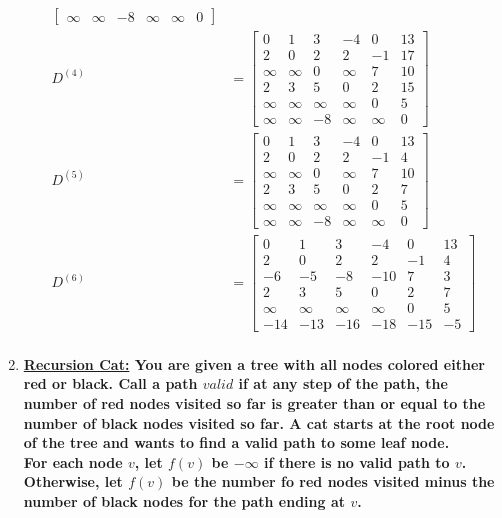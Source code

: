 \documentclass{article}
\begin{document}
\begin{enumerate}
\begin{align*}
\begin{bmatrix}
        \infty & \infty & -8 & \infty & \infty & 0
    \end{bmatrix} \\
    D^{(4)} & = 
    \begin{bmatrix}
        0 & 1 & 3 & -4 & 0 & 13 \\
        2 & 0 & 2 & 2 & -1 & 17 \\
        \infty & \infty & 0 & \infty & 7 & 10 \\
        2 & 3 & 5 & 0 & 2 & 15 \\
        \infty & \infty & \infty & \infty & 0 & 5 \\
        \infty & \infty & -8 & \infty & \infty & 0
    \end{bmatrix} \\
    D^{(5)} & = 
    \begin{bmatrix}
        0 & 1 & 3 & -4 & 0 & 13 \\
        2 & 0 & 2 & 2 & -1 & 4 \\
        \infty & \infty & 0 & \infty & 7 & 10 \\
        2 & 3 & 5 & 0 & 2 & 7 \\
        \infty & \infty & \infty & \infty & 0 & 5 \\
        \infty & \infty & -8 & \infty & \infty & 0
    \end{bmatrix} \\
    D^{(6)} & = 
    \begin{bmatrix}
        0 & 1 & 3 & -4 & 0 & 13 \\
        2 & 0 & 2 & 2 & -1 & 4 \\
        -6 & -5 & -8 & -10 & 7 & 3 \\
        2 & 3 & 5 & 0 & 2 & 7 \\
        \infty & \infty & \infty & \infty & 0 & 5 \\
        -14 & -13 & -16 & -18 & -15 & -5
    \end{bmatrix} \\
\end{align*}







 
\item \textbf{ \underline{Recursion Cat:} You are given a tree with all nodes colored either red or black. Call a path $valid$ if at any step of the path, the number of red nodes visited so far is greater than or equal to the number of black nodes visited so far. A cat starts at the root node of the tree and wants to find a valid path to some leaf node. } \\
\newline
\textbf{For each node $v$, let $f(v)$ be $-\infty$ if there is no valid path to $v$. Otherwise, let $f(v)$ be the number fo red nodes visited minus the number of black nodes for the path ending at $v$. }


\end{enumerate}
\end{document}
